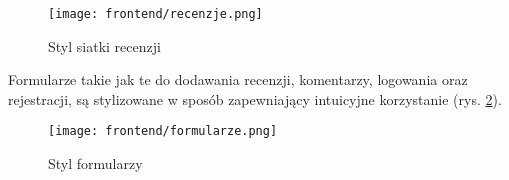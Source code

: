 \documentclass[../main.tex]{subfiles}
\begin{document}
\begin{figure}[htb]
	\centering
	\texttt{[image: frontend/recenzje.png]}
	\caption{Styl siatki recenzji}
	\label{fig:frontend:css_recenzje}
\end{figure}


Formularze takie jak te do dodawania recenzji, komentarzy, logowania oraz rejestracji, są stylizowane w sposób zapewniający intuicyjne korzystanie (rys. \ref{fig:frontend:css_form}).

\begin{figure}[htb]
	\centering
	\texttt{[image: frontend/formularze.png]}
	\caption{Styl formularzy}
	\label{fig:frontend:css_form}
\end{figure}
\end{document}
